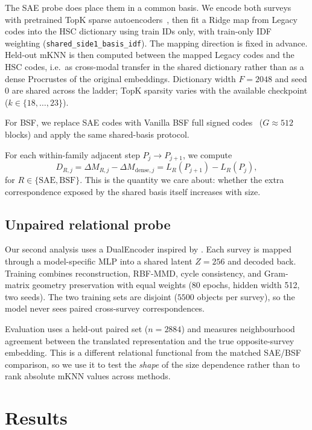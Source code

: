 \documentclass[11pt]{article}
\begin{document}
The SAE probe does place them in a common basis.
We encode both surveys with pretrained TopK sparse autoencoders~\citep{gao2025sae}, then fit a Ridge map from Legacy codes into the HSC dictionary using train IDs only, with train-only IDF weighting (\texttt{shared\_side1\_basis\_idf}).
The mapping direction is fixed in advance.
Held-out mKNN is then computed between the mapped Legacy codes and the HSC codes, i.e.\ as cross-modal transfer in the shared dictionary rather than as a dense Procrustes of the original embeddings.
Dictionary width \(F{=}2048\) and seed \(0\) are shared across the ladder; TopK sparsity varies with the available checkpoint (\(k\in\{18,\ldots,23\}\)).

For BSF, we replace SAE codes with Vanilla BSF full signed codes~\citep{fel2026bsf} (\(G{\approx}512\) blocks) and apply the same shared-basis protocol.

For each within-family adjacent step \(P_j\to P_{j+1}\), we compute
\[
D_{R,j}
=
\Delta M_{R,j}
-
\Delta M_{\mathrm{dense},j}
=
L_R(P_{j+1})-L_R(P_j),
\]
for \(R\in\{\mathrm{SAE},\mathrm{BSF}\}\).
This is the quantity we care about: whether the extra correspondence exposed by the shared basis itself increases with size.

\subsection{Unpaired relational probe}

Our second analysis uses a DualEncoder inspired by \citet{jha2025vec2vec}.
Each survey is mapped through a model-specific MLP into a shared latent \(Z{=}256\) and decoded back.
Training combines reconstruction, RBF-MMD, cycle consistency, and Gram-matrix geometry preservation with equal weights (80 epochs, hidden width 512, two seeds).
The two training sets are disjoint (\(5500\) objects per survey), so the model never sees paired cross-survey correspondences.

Evaluation uses a held-out paired set (\(n{=}2884\)) and measures neighbourhood agreement between the translated representation and the true opposite-survey embedding.
This is a different relational functional from the matched SAE/BSF comparison, so we use it to test the \emph{shape} of the size dependence rather than to rank absolute mKNN values across methods.

\section{Results}
\label{sec:results}
\end{document}
